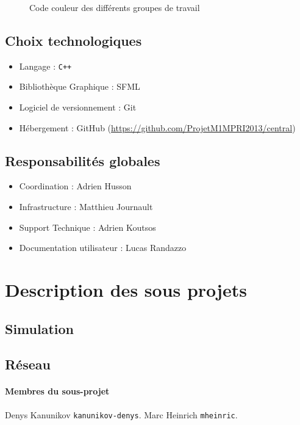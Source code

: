 \documentclass[a4paper,10pt]{article}
\begin{document}
\begin{figure}[h]
\centering
{}
 \caption{Code couleur des différents groupes de travail}
\end{figure}
\subsection{Choix technologiques}
\begin{itemize}
 \item Langage : \verb!C++!
 \item Bibliothèque Graphique : SFML
 \item Logiciel de versionnement : Git
 \item Hébergement : GitHub (\href{https://github.com/ProjetM1MPRI2013/central}{https://github.com/ProjetM1MPRI2013/central})
\end{itemize}
\subsection{Responsabilités globales}
\begin{itemize}
 \item Coordination : Adrien Husson
 \item Infrastructure : Matthieu Journault
 \item Support Technique : Adrien Koutsos
 \item Documentation utilisateur : Lucas Randazzo
\end{itemize}

\section{Description des sous projets}
\subsection{Simulation}
\subsection{Réseau}
\paragraph{Membres du sous-projet} Denys Kanunikov \verb!kanunikov-denys!. Marc Heinrich \verb!mheinric!.
\end{document}
